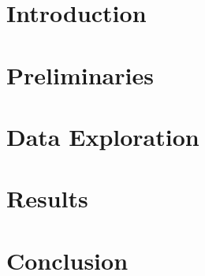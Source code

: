 \documentclass[a4paper, 12pt, oneside]{book}
\begin{document}
%

\chapter{Introduction}

\chapter{Preliminaries}
 

\chapter{Data Exploration}


\chapter{Results}

\chapter{Conclusion}


\end{document}
